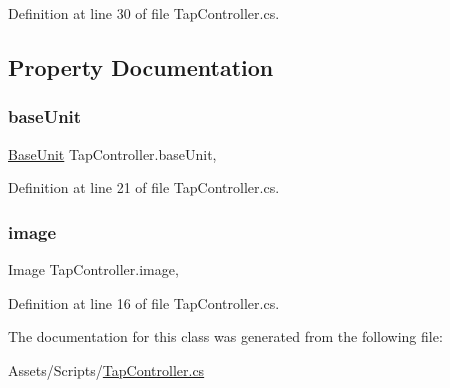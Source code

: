 Definition at line 30 of file Tap\+Controller.\+cs.



\subsection{Property Documentation}
\mbox{\label{class_tap_controller_ade0ce865eb39ef6a86a8015e5bb90a55}} 
\subsubsection{\texorpdfstring{baseUnit}{baseUnit}}
{\footnotesize\ttfamily \mbox{\hyperlink{class_base_unit}{Base\+Unit}} Tap\+Controller.\+base\+Unit\hspace{0.3cm}{\ttfamily [get]}, {\ttfamily [set]}}



Definition at line 21 of file Tap\+Controller.\+cs.

\mbox{\label{class_tap_controller_a0da9433117902759e995719f5ef952aa}} 
\subsubsection{\texorpdfstring{image}{image}}
{\footnotesize\ttfamily Image Tap\+Controller.\+image\hspace{0.3cm}{\ttfamily [get]}, {\ttfamily [set]}}



Definition at line 16 of file Tap\+Controller.\+cs.



The documentation for this class was generated from the following file\+:\begin{DoxyCompactItemize}
\item 
Assets/\+Scripts/\mbox{\hyperlink{_tap_controller_8cs}{Tap\+Controller.\+cs}}\end{DoxyCompactItemize}
